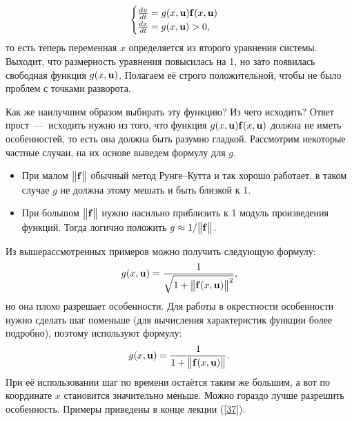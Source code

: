 \documentclass[a4paper,9pt,russian]{article}
\begin{document}
     \begin{equation}
        \begin{cases}
           \frac{du}{dt}=g(x,{\bf u}){\bf f}(x, {\bf u})\\
            \frac{dx}{dt}=g(x,{\bf u}) > 0,
        \end{cases}
    \end{equation}
    то есть теперь переменная $x$ определяется из второго уравнения системы. Выходит, что размерность уравнения повысилась на 1, но зато появилась свободная функция $g(x,{\bf u})$. Полагаем её строго положительной, чтобы не было проблем с точками разворота.\par
    Как же наилучшим образом выбирать эту функцию? Из чего исходить? Ответ прост~---~исходить нужно из того, что функция $g(x,{\bf u}){\bf f}(x, {\bf u})$ должна не иметь особенностей, то есть она должна быть разумно гладкой. Рассмотрим некоторые частные случаи, на их основе выведем формулу для $g$.
    \begin{itemize}
        \item При малом $\bigl\| {\bf f}\bigr\|$ обычный метод Рунге--Кутта и так хорошо работает, в таком случае $g$ не должна этому мешать и быть близкой к 1.
        \item При большом $\bigl\| {\bf f}\bigr\|$ нужно насильно приблизить к 1 модуль произведения функций. Тогда логично положить $g \approx 1/{\bigl\| {\bf f}\bigr\|}$.
    \end{itemize}
    Из вышерассмотренных примеров можно получить следующую формулу:
     \begin{equation}
       { g(x,{\bf u}) = \frac{1}{\sqrt{1+\bigl\|{\bf f}(x, {\bf u})\bigr\|^2}}},
    \end{equation}
    но она плохо разрешает особенности. Для работы в окрестности особенности нужно сделать шаг поменьше (для вычисления характеристик функции более подробно), поэтому используют формулу:
    \begin{equation}
        {g(x,{\bf u}) = \frac{1}{1+\bigl\|{\bf f}(x, {\bf u})\bigr\|}}.
    \end{equation}
    При её использовании шаг по времени остаётся таким же большим, а вот по координате $x$ становится значительно меньше. Можно гораздо лучше разрешить особенность.
    Примеры приведены в конце лекции (\ref{37}).
\end{document}
